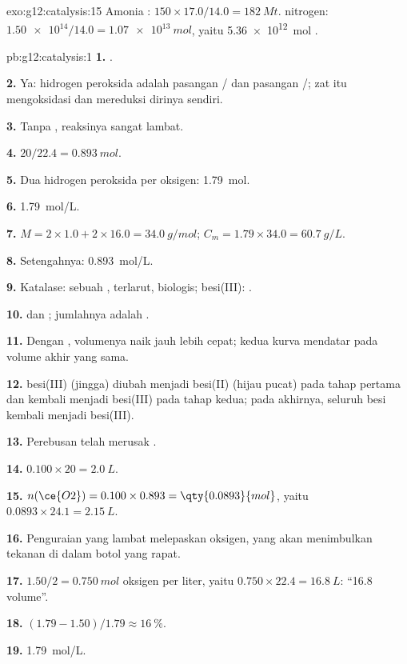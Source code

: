 \begin{solution}{exo:g12:catalysis:15}
Amonia : $150 \times 17.0 / 14.0 = \qty{182}{Mt}$. 
nitrogen: $\num{1.50e14} / 14.0 = \qty{1.07e13}{mol}$, yaitu
\qty{5.36e12}{mol} .
\end{solution}

\begin{solution}{pb:g12:catalysis:1}
\textbf{1.} .

\textbf{2.} Ya: hidrogen peroksida adalah  pasangan
/ dan  pasangan /; zat itu
mengoksidasi dan mereduksi dirinya sendiri.

\textbf{3.} Tanpa , reaksinya sangat lambat.

\textbf{4.} $20 / 22.4 = \qty{0.893}{mol}$.

\textbf{5.} Dua  hidrogen peroksida per  oksigen:
\qty{1.79}{mol}.

\textbf{6.} \qty{1.79}{mol/L}.

\textbf{7.} $M = 2 \times 1.0 + 2 \times 16.0 = \qty{34.0}{g/mol}$;
$C_m = 1.79 \times 34.0 = \qty{60.7}{g/L}$.

\textbf{8.} Setengahnya: \qty{0.893}{mol/L}.

\textbf{9.} Katalase: sebuah , terlarut,  biologis; 
besi(III): .

\textbf{10.}  dan
; jumlahnya adalah
.

\textbf{11.} Dengan , volumenya naik jauh lebih cepat; kedua
kurva mendatar pada volume akhir yang sama.

\textbf{12.}  besi(III) (jingga) diubah menjadi besi(II) (hijau
pucat) pada tahap pertama dan kembali menjadi besi(III) pada tahap
kedua; pada akhirnya, seluruh besi kembali menjadi besi(III).

\textbf{13.} Perebusan telah merusak .

\textbf{14.} $0.100 \times 20 = \qty{2.0}{L}$.

\textbf{15.} $n(\ce{O2}) = 0.100 \times 0.893 = \qty{0.0893}{mol}$,
yaitu $0.0893 \times 24.1 = \qty{2.15}{L}$.

\textbf{16.} Penguraian yang lambat melepaskan oksigen, yang akan
menimbulkan tekanan di dalam botol yang rapat.

\textbf{17.} $1.50 / 2 = \qty{0.750}{mol}$ oksigen per liter, yaitu
$0.750 \times 22.4 = \qty{16.8}{L}$: ``16.8 volume''.

\textbf{18.} $(1.79 - 1.50)/1.79 \approx \qty{16}{\percent}$.

\textbf{19.} \qty{1.79}{mol/L}.
\end{solution}
